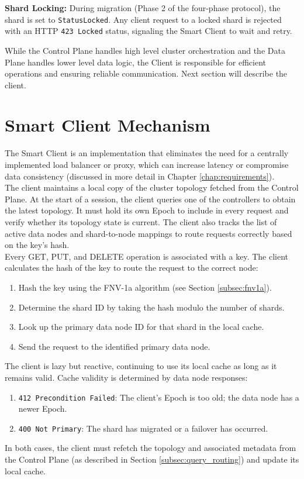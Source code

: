 \documentclass[shortabstract]{iithesis}
\begin{document}
\noindent \textbf{Shard Locking:} During migration (Phase 2 of the four-phase protocol), the shard is set to \texttt{StatusLocked}. Any client request to a locked shard is rejected with an HTTP \texttt{423 Locked} status, signaling the Smart Client to wait and retry.

While the Control Plane handles high level cluster orchestration and the Data Plane handles lower level data logic, the Client is responsible for efficient operations and ensuring reliable communication. Next section will describe the client. 

\section{Smart Client Mechanism}

The Smart Client is an implementation that eliminates the need for a centrally implemented load balancer or proxy, which can increase latency or compromise data consistency (discussed in more detail in Chapter \ref{chap:requirements}). \\

The client maintains a local copy of the cluster topology fetched from the Control Plane. At the start of a session, the client queries one of the controllers to obtain the latest topology. It must hold its own Epoch to include in every request and verify whether its topology state is current. The client also tracks the list of active data nodes and shard-to-node mappings to route requests correctly based on the key's hash.\\

\noindent Every GET, PUT, and DELETE operation is associated with a key. The client calculates the hash of the key to route the request to the correct node:
\begin{enumerate}
    \item Hash the key using the FNV-1a algorithm (see Section \ref{subsec:fnv1a}).
    \item Determine the shard ID by taking the hash modulo the number of shards.
    \item Look up the primary data node ID for that shard in the local cache.
    \item Send the request to the identified primary data node.
\end{enumerate}

\noindent The client is lazy but reactive, continuing to use its local cache as long as it remains valid. Cache validity is determined by data node responses: 
\begin{enumerate}
    \item \texttt{412 Precondition Failed}: The client's Epoch is too old; the data node has a newer Epoch.
    \item \texttt{400 Not Primary}: The shard has migrated or a failover has occurred.
\end{enumerate}
\noindent In both cases, the client must refetch the topology and associated metadata from the Control Plane (as described in Section \ref{subsec:query_routing}) and update its local cache. 
\end{document}
